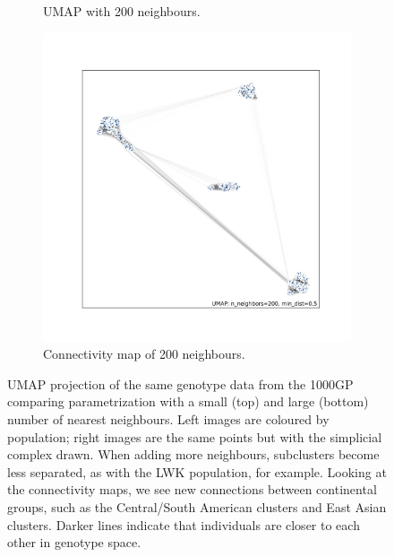 \documentclass[12pt]{article}
\begin{document}
\begin{figure}[h!]
\begin{subfigure}[b]{0.48\linewidth}
    \caption{UMAP with 200 neighbours.}
    \label{fig:UMAP_high_NN_1KGP}
  \end{subfigure}
  \begin{subfigure}[b]{0.48\linewidth}
    \includegraphics[width=\linewidth]{code/images/UMAP_connectivity_high_NN.png}
    \caption{Connectivity map of 200 neighbours.}
    \label{fig:UMAP_high_NN_connectivity}
  \end{subfigure}
  \caption{UMAP projection of the same genotype data from the 1000GP comparing parametrization with a small (top) and large (bottom) number of nearest neighbours. Left images are coloured by population; right images are the same points but with the simplicial complex drawn. When adding more neighbours, subclusters become less separated, as with the LWK population, for example. Looking at the connectivity maps, we see new connections between continental groups, such as the Central/South American clusters and East Asian clusters. Darker lines indicate that individuals are closer to each other in genotype space.}
  \label{fig:UMAP_connectivity}
\end{figure}

\clearpage
\newpage

%
%


\end{document}
